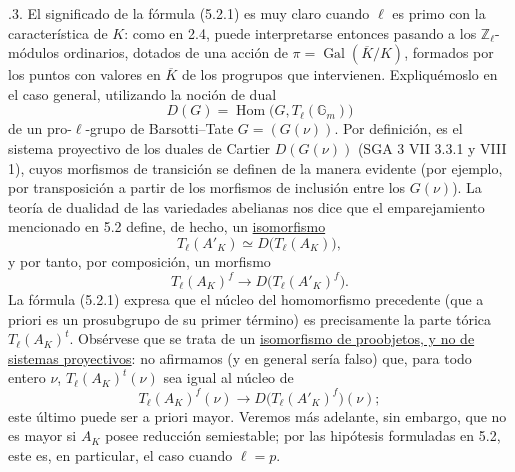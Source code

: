 \smallskip
{}.3. El significado de la fórmula (5.2.1) es muy claro cuando $\ell$
es primo con la característica de $K$: como en 2.4, puede interpretarse
entonces pasando a los $\mathbb Z_\ell$-módulos ordinarios, dotados de
una acción de $\pi=\operatorname{Gal}(\overline K/K)$, formados por los
puntos con valores en $\overline K$ de los progrupos que intervienen.
Expliquémoslo en el caso general, utilizando la noción de dual
\begin{equation}\tag{5.2.3.1}
 D(G)=\operatorname{Hom}\bigl(G,T_\ell(\mathbb G_m)\bigr)
\end{equation}
de un pro-$\ell$-grupo de Barsotti--Tate $G=(G(\nu))$. Por definición,
es el sistema proyectivo de los duales de Cartier $D(G(\nu))$
(SGA 3 VII 3.3.1 y VIII 1), cuyos morfismos de transición se definen
de la manera evidente (por ejemplo, por transposición a partir de los
morfismos de inclusión entre los $G(\nu)$). La teoría de dualidad de
las variedades abelianas nos dice que el emparejamiento mencionado en
5.2 define, de hecho, un \underline{isomorfismo}
\begin{equation}\tag{5.2.3.2}
 T_\ell(A'_K)\simeq D\bigl(T_\ell(A_K)\bigr),
\end{equation}
y por tanto, por composición, un morfismo
\begin{equation}\tag{5.2.3.3}
 T_\ell(A_K)^f\longrightarrow D\bigl(T_\ell(A'_K)^f\bigr).
\end{equation}
La fórmula (5.2.1) expresa que el núcleo del homomorfismo precedente
(que a priori es un prosubgrupo de su primer término) es precisamente
la parte tórica $T_\ell(A_K)^t$. Obsérvese que se trata de un
\underline{isomorfismo de proobjetos, y no de sistemas proyectivos}:
no afirmamos (y en general sería falso) que, para todo entero $\nu$,
$T_\ell(A_K)^t(\nu)$ sea igual al núcleo de
\[
 T_\ell(A_K)^f(\nu)
 \longrightarrow
 D\bigl(T_\ell(A'_K)^f\bigr)(\nu);
\]
este último puede ser a priori mayor. Veremos más adelante, sin embargo,
que no es mayor si $A_K$ posee reducción semiestable; por las hipótesis
formuladas en 5.2, este es, en particular, el caso cuando $\ell=p$.

